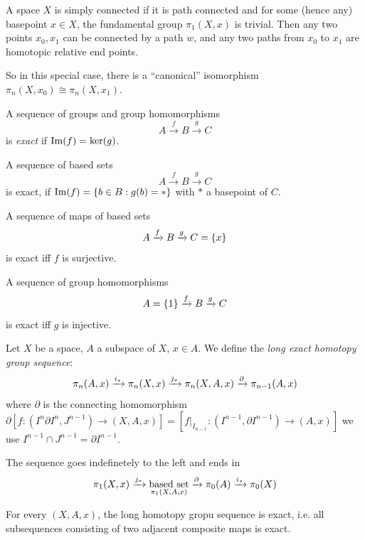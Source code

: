 \documentclass{TemplateLecture}
\begin{document}
    A space \(X\) is simply connected if it is path connected and for some (hence any) basepoint \(x \in X\), the fundamental group \(\pi_1(X,x)\) is trivial. Then any two points \(x_0, x_1\) can be connected by a path \(w\), and any two paths from \(x_0\) to \(x_1\) are homotopic relative end points.

    So in this special case, there is a \enquote{canonical} isomorphism \(\pi_n(X,x_0) \cong \pi_n(X,x_1)\).

\begin{defi}{}{}
    A sequence of groups and group homomorphisms
    \[A \xrightarrow{f} B \xrightarrow{g} C\]
    is \emph{exact} if \(\mathrm{Im}(f) = \ker(g)\).

    A sequence of based sets
    \[A \xrightarrow{f} B \xrightarrow{g} C\]
    is exact, if \(\mathrm{Im}(f) = \{b \in B: g(b) = *\}\) with \(*\) a basepoint of \(C\).
\end{defi}

\begin{example}
    A sequence of maps of based sets
    \[A \xrightarrow{f} B \xrightarrow{g} C = \{x\}\]
    is exact iff \(f\) is surjective.

    A sequence of group homomorphisms
    \[A = \{1\} \xrightarrow{f} B \xrightarrow{g} C\]
    is exact iff \(g\) is injective.
\end{example}

\begin{defi}
    Let \(X\) be a space, \(A\) a subspace of \(X\), \(x \in A\). We define the \emph{long exact homotopy group sequence}:
    \[\pi_n(A,x) \xrightarrow{i_*} \pi_n(X,x) \xrightarrow{j_*} \pi_n(X,A,x) \xrightarrow{\partial} \pi_{n-1}(A,x)\]
    where \(\partial\) is the connecting homomorphism \(\partial[f\colon (I^n \partial I^n, J^{n-1}) \to (X,A,x)] = [f\rvert_{I_{n-1}} \colon (I^{n-1}, \partial I^{n-1}) \to (A,x)]\) we use \(I^{n-1} \cap J^{n-1} = \partial I^{n-1}\).

    The sequence goes indefinetely to the left and ends in
    \[\pi_1(X,x) \xrightarrow{j_*} \underset{\pi_1(X,A,x)}{\text{based set}} \xrightarrow{\partial} \pi_0(A) \xrightarrow{i_*} \pi_0(X)\]
\end{defi}

\begin{thm}
    For every \((X,A,x)\), the long homotopy gropu sequence is exact, i.e. all subsequences consisting of two adjacent composite maps is exact.
\end{thm}
\end{document}
